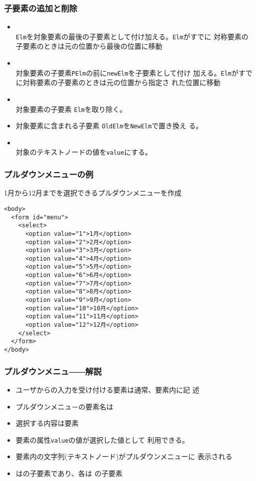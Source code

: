 \begin{frame}[containsverbatim]
 \frametitle{子要素の追加と削除}
\begin{itemize}
 \item {} \\
  \texttt{Elm}を対象要素の最後の子要素として付け加える。\texttt{Elm}がすでに
	  対称要素の子要素のときは元の位置から最後の位置に移動
 \item {} \\
   対象要素の子要素\texttt{PElm}の前に\texttt{newElm}を子要素として付け
  加える。\texttt{Elm}がすでに対称要素の子要素のときは元の位置から指定さ
	  れた位置に移動
 \item {} \\
対象要素の子要素  \texttt{Elm}を取り除く。
 \item {}
   対象要素に含まれる子要素  \texttt{OldElm}を\texttt{NewElm}で置き換え
       る。
 \item {} \\
 {対象のテキストノードの値を\texttt{value}にする。}
\end{itemize}
\end{frame}
\begin{frame}[containsverbatim]
 \frametitle{プルダウンメニューの例}
1月から12月までを選択できるプルダウンメニューを作成
\begin{Verbatim}[fontsize=\small]
<body>
  <form id="menu">
    <select>
      <option value="1">1月</option>
      <option value="2">2月</option>
      <option value="3">3月</option>
      <option value="4">4月</option>
      <option value="5">5月</option>
      <option value="6">6月</option>
      <option value="7">7月</option>
      <option value="8">8月</option>
      <option value="9">9月</option>
      <option value="10">10月</option>
      <option value="11">11月</option>
      <option value="12">12月</option>
    </select>
  </form>
</body>
\end{Verbatim}
\end{frame}
\begin{frame}[containsverbatim]
 \frametitle{プルダウンメニュ――解説}
\begin{itemize}
 \item ユーザからの入力を受け付ける要素は通常、要素内に記
       述
 \item プルダウンメニュ－の要素名は
 \item 選択する内容は要素
 \item {}要素の属性\texttt{value}の値が選択した値として
       利用できる。
 \item {}要素内の文字列(テキストノード)がプルダウンメニューに
       表示される
 \item {}はの子要素であり、各は
       の子要素
\end{itemize}
\end{frame}
